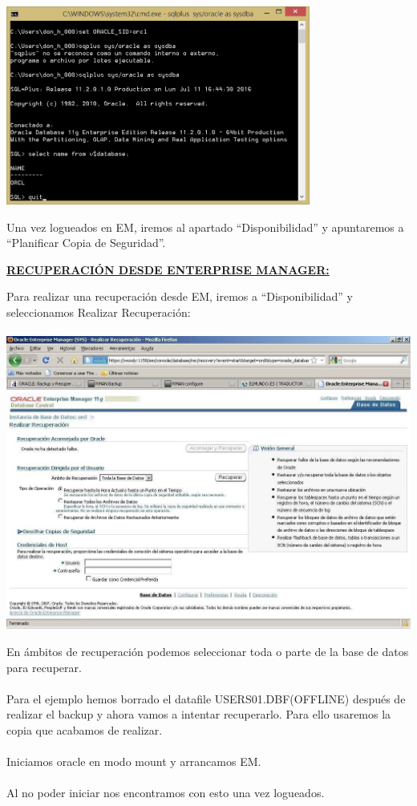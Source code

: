 \documentclass[12pt,letterpaper]{article}
\begin{document}
{\includegraphics[width=10cm]{./imagen/imagen-1}

Una vez logueados en EM, iremos al apartado “Disponibilidad” y apuntaremos a
“Planificar Copia de Seguridad”.

\begin{enumerate}
\bf\underline{RECUPERACIÓN  DESDE  ENTERPRISE  MANAGER:}
\end{enumerate}
Para realizar una recuperación desde EM, iremos a “Disponibilidad” y seleccionamos Realizar Recuperación: \\
\\
\includegraphics[width=14cm]{./IMG/img40.jpg}

En ámbitos de recuperación podemos seleccionar toda o parte de la base de datos para recuperar. \\
\\
Para  el  ejemplo  hemos  borrado  el  datafile  USERS01.DBF(OFFLINE)  después  de realizar el backup y ahora vamos a intentar recuperarlo. Para ello usaremos la copia que acabamos de realizar. \\
\\
Iniciamos oracle en modo mount y arrancamos EM. \\
\\
Al no poder iniciar nos encontramos con esto una vez logueados.

}
\end{document}
